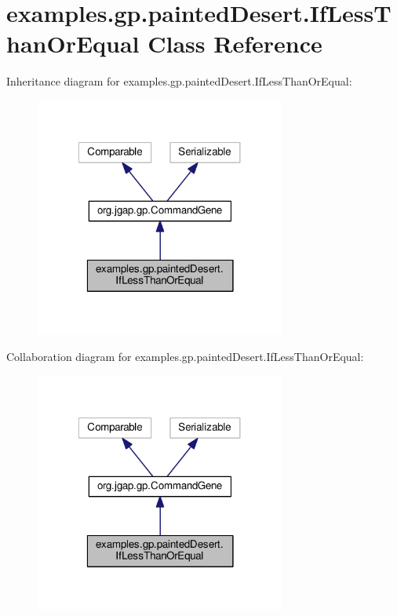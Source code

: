 \hypertarget{classexamples_1_1gp_1_1painted_desert_1_1_if_less_than_or_equal}{\section{examples.\-gp.\-painted\-Desert.\-If\-Less\-Than\-Or\-Equal Class Reference}
\label{classexamples_1_1gp_1_1painted_desert_1_1_if_less_than_or_equal}
}


Inheritance diagram for examples.\-gp.\-painted\-Desert.\-If\-Less\-Than\-Or\-Equal\-:
\nopagebreak
\begin{figure}[H]
\begin{center}
\leavevmode
\includegraphics[width=233pt]{classexamples_1_1gp_1_1painted_desert_1_1_if_less_than_or_equal__inherit__graph}
\end{center}
\end{figure}


Collaboration diagram for examples.\-gp.\-painted\-Desert.\-If\-Less\-Than\-Or\-Equal\-:
\nopagebreak
\begin{figure}[H]
\begin{center}
\leavevmode
\includegraphics[width=233pt]{classexamples_1_1gp_1_1painted_desert_1_1_if_less_than_or_equal__coll__graph}
\end{center}
\end{figure}
